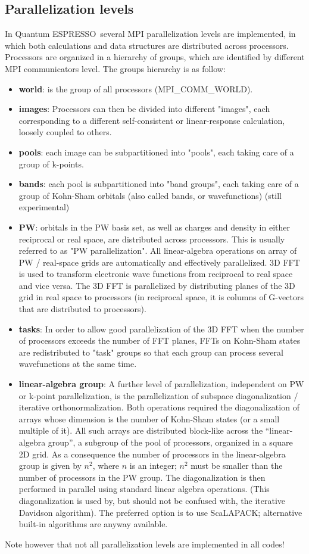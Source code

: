 \documentclass[12pt,a4paper]{article}
\def\qe{{\sc Quantum ESPRESSO}}
\begin{document}
\subsection{Parallelization levels}

In \qe\ several MPI parallelization levels are
implemented, in which both calculations
and data structures are distributed across processors.
Processors are organized in a hierarchy of groups,
which are identified by different MPI communicators level.
The groups hierarchy is as follow:
\begin{itemize}
\item {\bf world}: is the group of all processors (MPI\_COMM\_WORLD).
\item
{\bf images}: Processors can then be divided into different "images", each corresponding to a
different self-consistent or linear-response
calculation, loosely coupled to others.
\item
{\bf pools}: each image can be subpartitioned into
"pools", each taking care of a group of k-points.
\item
{\bf bands}: each pool is subpartitioned into
"band groups", each taking care of a group
of Kohn-Sham orbitals (also called bands, or
wavefunctions) (still experimental)
\item
{\bf PW}: orbitals in the PW basis set,
as well as charges and density in either
reciprocal or real space, are distributed
across processors.
This is usually referred to as "PW parallelization".
All linear-algebra operations on array of  PW /
real-space grids are automatically and effectively parallelized.
3D FFT is used to transform electronic wave functions from
reciprocal to real space and vice versa. The 3D FFT is
parallelized by distributing planes of the 3D grid in real
space to processors (in reciprocal space, it is columns of
G-vectors that are distributed to processors).
\item
{\bf tasks}:
In order to allow good parallelization of the 3D FFT when
the number of processors exceeds the number of FFT planes,
FFTs on Kohn-Sham states are redistributed to
"task" groups so that each group
can process several wavefunctions at the same time.
\item
{\bf linear-algebra group}:
A further level of parallelization, independent on
PW or k-point parallelization, is the parallelization of
subspace diagonalization / iterative orthonormalization.
 Both operations required the diagonalization of
arrays whose dimension is the number of Kohn-Sham states
(or a small multiple of it). All such arrays are distributed block-like
across the ``linear-algebra group'', a subgroup of the pool of processors,
organized in a square 2D grid. As a consequence the number of processors
in the linear-algebra group is given by $n^2$, where $n$ is an integer;
$n^2$ must be smaller than the number of processors in the PW group.
The diagonalization is then performed
in parallel using standard linear algebra operations.
(This diagonalization is used by, but should not be confused with,
the iterative Davidson algorithm). The preferred option is to use
ScaLAPACK; alternative built-in algorithms are anyway available.
\end{itemize}
Note however that not all parallelization levels
are implemented in all codes!
\end{document}
